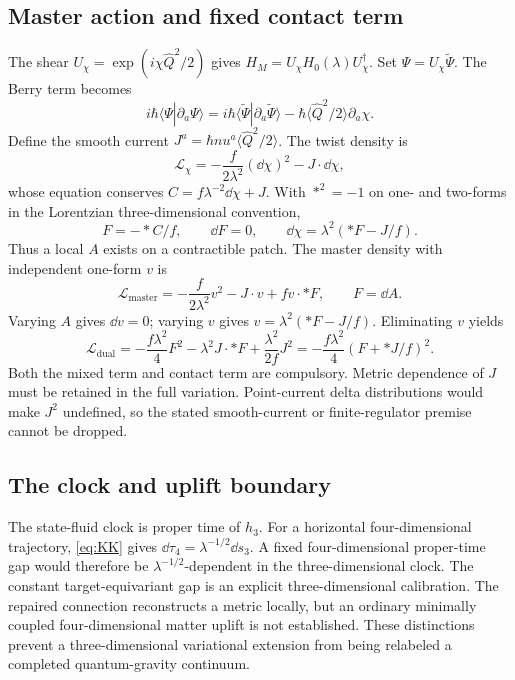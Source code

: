 \documentclass[11pt]{article}
\begin{document}
\subsection{Master action and fixed contact term}
The shear $U_\chi=\exp(i\chi\widehat Q^2/2)$ gives $H_M=U_\chi H_0(\lambda)U_\chi^\dagger$. Set $\Psi=U_\chi\widetilde\Psi$. The Berry term becomes
\[
i\hbar\langle\Psi|\partial_a\Psi\rangle
=i\hbar\langle\widetilde\Psi|\partial_a\widetilde\Psi\rangle
-\hbar\langle\widehat Q^2/2\rangle\partial_a\chi.
\]
Define the smooth current $J^a=\hbar nu^a\langle\widehat Q^2/2\rangle$. The twist density is
\[
\mathcal L_\chi=-\frac f{2\lambda^2}(\dd\chi)^2-J\cdot\dd\chi,
\]
whose equation conserves $C=f\lambda^{-2}\dd\chi+J$. With $*^2=-1$ on one- and two-forms in the Lorentzian three-dimensional convention,
\begin{equation}\label{eq:currentmap}
\boxed{F=-*C/f,\qquad\dd F=0,\qquad
\dd\chi=\lambda^2(*F-J/f).}
\end{equation}
Thus a local $A$ exists on a contractible patch. The master density with independent one-form $v$ is
\[
\mathcal L_{\mathrm{master}}=-\frac f{2\lambda^2}v^2-J\cdot v+fv\cdot*F,
\qquad F=\dd A.
\]
Varying $A$ gives $\dd v=0$; varying $v$ gives $v=\lambda^2(*F-J/f)$. Eliminating $v$ yields
\begin{equation}\label{eq:dual}
\boxed{\mathcal L_{\mathrm{dual}}=-\frac{f\lambda^2}{4}F^2
-\lambda^2J\cdot*F+\frac{\lambda^2}{2f}J^2
=-\frac{f\lambda^2}{4}(F+*J/f)^2.}
\end{equation}
Both the mixed term and contact term are compulsory. Metric dependence of $J$ must be retained in the full variation. Point-current delta distributions would make $J^2$ undefined, so the stated smooth-current or finite-regulator premise cannot be dropped.

\subsection{The clock and uplift boundary}
The state-fluid clock is proper time of $h_3$. For a horizontal four-dimensional trajectory, \eqref{eq:KK} gives $\dd\tau_4=\lambda^{-1/2}\dd s_3$. A fixed four-dimensional proper-time gap would therefore be $\lambda^{-1/2}$-dependent in the three-dimensional clock. The constant target-equivariant gap is an explicit three-dimensional calibration. The repaired connection reconstructs a metric locally, but an ordinary minimally coupled four-dimensional matter uplift is not established. These distinctions prevent a three-dimensional variational extension from being relabeled a completed quantum-gravity continuum.
\end{document}
